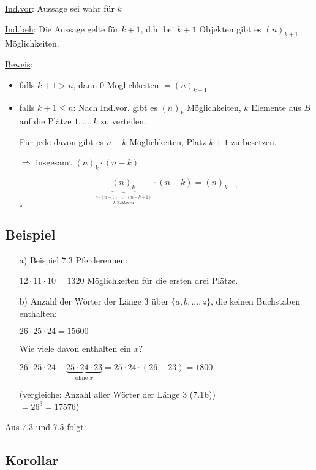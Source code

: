 \documentclass[a4paper, 12pt, twoside] {article}
\begin{document}
\uline{Ind.vor}: Aussage sei wahr für $k$

\uline{Ind.beh}: Die Aussage gelte für $k+1$, d.h. bei $k+1$ Objekten gibt es $(n)_{k+1}$ Möglichkeiten.

\uline{Beweis}:

\begin{itemize}

\item falls $k+1 > n$, dann $0$ Möglichkeiten $= (n)_{k+1}$

\item falls $k+1 \leq n$: Nach Ind.vor. gibt es $(n)_k$ Möglichkeiten, $k$ Elemente aus $B$ auf die Plätze $1, ... ,k$ zu verteilen.

Für jede davon gibt es $n-k$ Möglichkeiten, Platz $k+1$ zu besetzen.

$\Rightarrow$ insgesamt $(n)_k \cdot (n-k)$

$$\underbrace{(n)_k}_{\frac{n \cdot (n-1) \cdot ... \cdot (n-k+1)}{k \text{ Faktoren}}} \cdot (n-k) = (n)_{k+1}$$
\hfill $\square$

\end{itemize}

\subsection{Beispiel} %
\begin{itemize}

\item[a)] Beispiel 7.3 Pferderennen:

$12 \cdot 11 \cdot 10 = 1320$ Möglichkeiten für die ersten drei Plätze.

\item[b)] Anzahl der Wörter der Länge $3$ über $\{a, b, ... ,z\}$, die keinen Buchstaben enthalten:

$26 \cdot 25 \cdot 24 = 15600$

Wie viele davon enthalten ein $x$?

$26 \cdot 25 \cdot 24 - \underbrace{25 \cdot 24 \cdot 23}_{\text{ohne } x} = 25 \cdot 24 \cdot (26 - 23) = 1800$

(vergleiche: Anzahl aller Wörter der Länge $3$ (7.1b)) \\
$= 26^3 = 17576$)

\end{itemize}

Aus 7.3 und 7.5 folgt:

\subsection{Korollar} %
\end{document}
